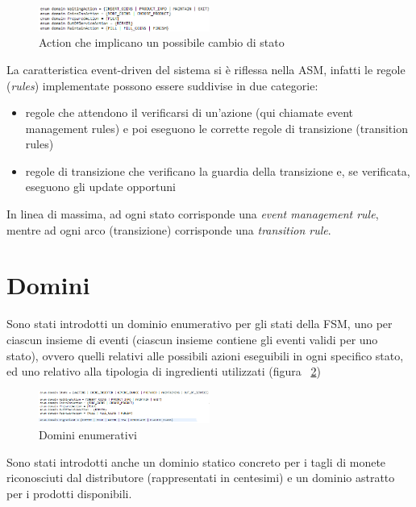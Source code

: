 \begin{figure}[h]
	\centering
	\includegraphics[width=0.5\textwidth]{Immagini/ActionASM.png}
	\caption{Action che implicano un possibile cambio di stato}
	\label{fig:actionASM}
\end{figure}

La caratteristica event-driven del sistema si è riflessa nella ASM, infatti le regole (\textit{rules}) implementate possono essere suddivise in due categorie:
\begin{itemize}
	\item  regole che attendono il verificarsi di un’azione (qui chiamate event management rules) e poi eseguono le corrette regole di transizione (transition rules)
	\item regole di transizione che verificano la guardia della transizione e, se verificata, eseguono gli update opportuni
\end{itemize}
	
In linea di massima, ad ogni stato corrisponde una \textit{event management rule}, mentre ad ogni arco (transizione) corrisponde una \textit{transition rule}.

\section{Domini}
Sono stati introdotti un dominio enumerativo per gli stati della FSM, uno per ciascun insieme di eventi (ciascun insieme contiene gli eventi validi per uno stato), ovvero quelli relativi alle possibili azioni eseguibili in ogni specifico stato, ed uno relativo alla tipologia di ingredienti utilizzati (figura ~\ref{fig:enumDomain})

\begin{figure}[h]
	\centering
	\includegraphics[width=0.5\textwidth]{Immagini/EnumDomain.png}
	\caption{Domini enumerativi}
	\label{fig:enumDomain}
\end{figure}

Sono stati introdotti anche un dominio statico concreto per i tagli di monete riconosciuti dal distributore (rappresentati in centesimi) e un dominio astratto per i prodotti disponibili.

